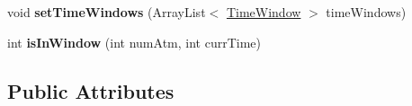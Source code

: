 \begin{DoxyCompactItemize}
\item 
void {\bfseries set\+Time\+Windows} (Array\+List$<$ \hyperlink{classheneticmethod_1_1_time_window}{Time\+Window} $>$ time\+Windows)\hypertarget{classheneticmethod_1_1_matrix_a665fd9a84a7b10bfa821ef21a01caf0a}{}\label{classheneticmethod_1_1_matrix_a665fd9a84a7b10bfa821ef21a01caf0a}

\item 
int {\bfseries is\+In\+Window} (int num\+Atm, int curr\+Time)\hypertarget{classheneticmethod_1_1_matrix_a7a2f5e59c00fec3c02ea10f62575df59}{}\label{classheneticmethod_1_1_matrix_a7a2f5e59c00fec3c02ea10f62575df59}

\end{DoxyCompactItemize}
\subsection*{Public Attributes}
